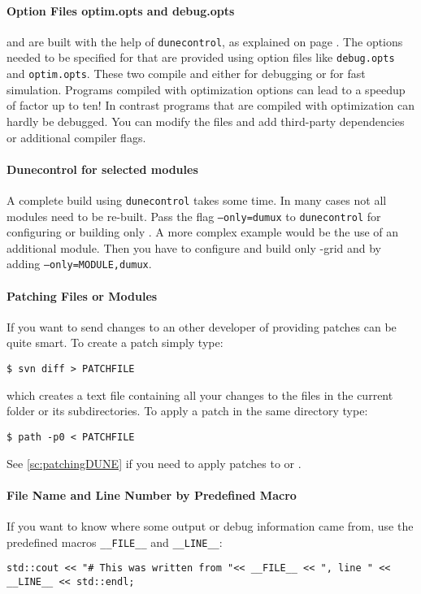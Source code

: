 \paragraph{Option Files optim.opts and debug.opts}
\Dune and \Dumux are built with the help of \texttt{dunecontrol}, as explained on page \pageref{buildIt}.
The options needed to be specified for that are provided using option files like
\texttt{debug.opts} and \texttt{optim.opts}. These two compile \Dune and \Dumux
either for debugging or for fast simulation. Programs compiled with optimization options
can lead to a speedup of factor up to ten!
In contrast programs that are compiled with optimization can hardly be debugged.
You can modify the files and add third-party dependencies or additional compiler flags.

\paragraph{Dunecontrol for selected modules}
A complete build using \texttt{dunecontrol} takes some time. In many cases not all modules need to be re-built.
Pass the flag \texttt{--only=dumux} to \texttt{dunecontrol} for configuring or building only \Dumux. A more
complex example would be the use of an additional module. Then you have to configure and build only \Dune{}-grid
and \Dumux by adding \texttt{--only=MODULE,dumux}.

\paragraph{Patching Files or Modules}
If you want to send changes to an other developer of \Dumux providing patches
can be quite smart. To create a patch simply type:
\begin{lstlisting}[style=Bash]
$ svn diff > PATCHFILE
\end{lstlisting}
\noindent which creates a text file containing all your changes to the files
in the current folder or its subdirectories.
To apply a patch in the same directory type:
\begin{lstlisting}[style=Bash]
$ path -p0 < PATCHFILE
\end{lstlisting}
See \ref{sc:patchingDUNE} if you need to apply patches to \Dumux or \Dune.

\paragraph{File Name and Line Number by Predefined Macro}
If you want to  know where some output or debug information came from, use the predefined
macros \texttt{\_\_FILE\_\_} and \texttt{\_\_LINE\_\_}:
\begin{lstlisting}[style=DumuxCode]
std::cout << "# This was written from "<< __FILE__ << ", line " << __LINE__ << std::endl;
\end{lstlisting}

